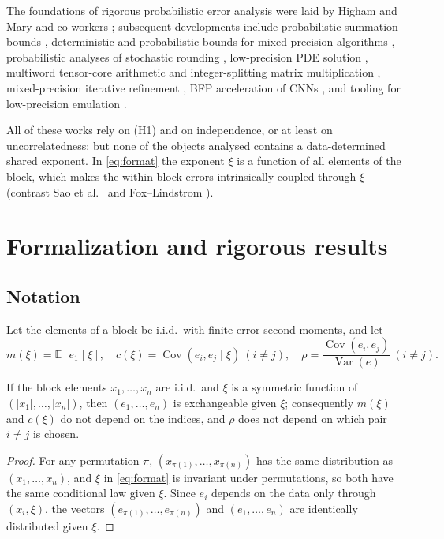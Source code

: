 \documentclass[twocolumn,review,hidelinks,oneeqnum,onetabnum,onefignum,onethmnum]{siamart251216}
\begin{document}
The foundations of rigorous probabilistic error analysis were laid by Higham
and Mary and co-workers \cite{higham2019}; subsequent developments include
probabilistic summation bounds \cite{hallman2023}, deterministic and
probabilistic bounds for mixed-precision algorithms
\cite{bhola2024a,bhola2024b}, probabilistic analyses of stochastic rounding
\cite{elarar2024,drineas2024,elarar2026}, low-precision PDE solution
\cite{croci2022}, multiword tensor-core arithmetic and integer-splitting matrix
multiplication \cite{fasi2023,abdelfattah2025}, mixed-precision iterative
refinement \cite{carson2024}, BFP acceleration of CNNs \cite{fan2018}, and
tooling for low-precision emulation \cite{carson2025}.

All of these works rely on (H1) and on independence, or at least on
uncorrelatedness; but none of the objects analysed contains a data-determined
shared exponent. In \cref{eq:format} the exponent $\xi$ is a function of all
elements of the block, which makes the within-block errors intrinsically
coupled through $\xi$ (contrast Sao et al.\ \cite{sao2026trees} and
Fox--Lindstrom \cite{fox2024zfp}).

\section{Formalization and rigorous results}
\label{sec:formal}

\subsection{Notation}

Let the elements of a block be i.i.d.\ with finite error second moments, and let
\begin{equation}
m(\xi)=\mathbb{E}[e_1\mid\xi],\quad
c(\xi)=\operatorname{Cov}(e_i,e_j\mid\xi)\ (i\ne j),\quad
\rho=\frac{\operatorname{Cov}(e_i,e_j)}{\operatorname{Var}(e)}\ (i\ne j).
\label{eq:notation}
\end{equation}

\begin{lemma}
\label{lem:exch}
If the block elements $x_1,\dots,x_n$ are i.i.d.\ and $\xi$ is a symmetric
function of $(|x_1|,\dots,|x_n|)$, then $(e_1,\dots,e_n)$ is exchangeable given
$\xi$; consequently $m(\xi)$ and $c(\xi)$ do not depend on the indices, and
$\rho$ does not depend on which pair $i\ne j$ is chosen.
\end{lemma}

\begin{proof}
For any permutation $\pi$, $(x_{\pi(1)},\dots,x_{\pi(n)})$ has the same
distribution as $(x_1,\dots,x_n)$, and $\xi$ in \cref{eq:format} is invariant
under permutations, so both have the same conditional law given $\xi$. Since
$e_i$ depends on the data only through $(x_i,\xi)$, the vectors
$(e_{\pi(1)},\dots,e_{\pi(n)})$ and $(e_1,\dots,e_n)$ are identically distributed
given $\xi$.
\end{proof}
\end{document}
